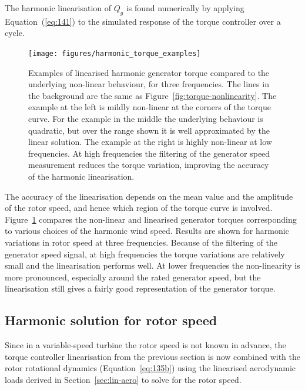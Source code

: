 \documentclass[preprint]{elsarticle}
\begin{document}
The harmonic linearisation of $Q_g$ is found numerically by applying
Equation~(\ref{eq:141}) to the simulated response of the torque controller over
a cycle.

\begin{figure}
  \centering
  \texttt{[image: figures/harmonic\_torque\_examples]}
  \caption{Examples of linearised harmonic generator torque compared to the
    underlying non-linear behaviour, for three frequencies. The lines in the
    background are the same as Figure~\ref{fig:torque-nonlinearity}. The example
    at the left is mildly non-linear at the corners of the torque curve. For the
    example in the middle the underlying behaviour is quadratic, but over the
    range shown it is well approximated by the linear solution. The example at
    the right is highly non-linear at low frequencies. At high frequencies the
    filtering of the generator speed measurement reduces the torque variation,
    improving the accuracy of the harmonic linearisation.}
\label{fig:harmonic-generator-vs-speed}
\end{figure}

The accuracy of the linearisation depends on the mean value and the amplitude of
the rotor speed, and hence which region of the torque curve is involved.
Figure~\ref{fig:harmonic-generator-vs-speed} compares the non-linear and
linearised generator torques corresponding to various choices of the harmonic
wind speed. Results are shown for harmonic variations in rotor speed at three
frequencies. Because of the filtering of the generator speed signal, at high
frequencies the torque variations are relatively small and the linearisation
performs well. At lower frequencies the non-linearity is more pronounced,
especially around the rated generator speed, but the linearisation still gives a
fairly good representation of the generator torque.

\subsection{Harmonic solution for rotor speed}
\label{sec:harm-solut-gener}

Since in a variable-speed turbine the rotor speed is not known in advance, the
torque controller linearisation from the previous section is now combined with
the rotor rotational dynamics (Equation~\ref{eq:135b}) using the linearised
aerodynamic loads derived in Section~\ref{sec:lin-aero} to solve for the rotor
speed.
\end{document}
